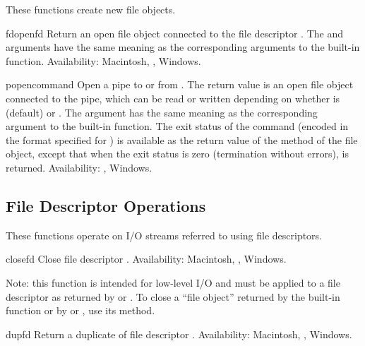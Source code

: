 These functions create new file objects.


\begin{funcdesc}{fdopen}{fd}
Return an open file object connected to the file descriptor .
The  and  arguments have the same meaning as
the corresponding arguments to the built-in 
function.
Availability: Macintosh, \UNIX{}, Windows.
\end{funcdesc}

\begin{funcdesc}{popen}{command}
Open a pipe to or from .  The return value is an open
file object connected to the pipe, which can be read or written
depending on whether  is  (default) or .
The  argument has the same meaning as the corresponding
argument to the built-in  function.  The exit status of
the command (encoded in the format specified for ) is
available as the return value of the  method of the file
object, except that when the exit status is zero (termination without
errors),  is returned.
Availability: \UNIX{}, Windows.
\end{funcdesc}



\subsection{File Descriptor Operations \label{os-fd-ops}}

These functions operate on I/O streams referred to
using file descriptors.


\begin{funcdesc}{close}{fd}
Close file descriptor .
Availability: Macintosh, \UNIX{}, Windows.

Note: this function is intended for low-level I/O and must be applied
to a file descriptor as returned by  or
.  To close a ``file object'' returned by the
built-in function  or by  or
, use its  method.
\end{funcdesc}

\begin{funcdesc}{dup}{fd}
Return a duplicate of file descriptor .
Availability: Macintosh, \UNIX{}, Windows.
\end{funcdesc}


